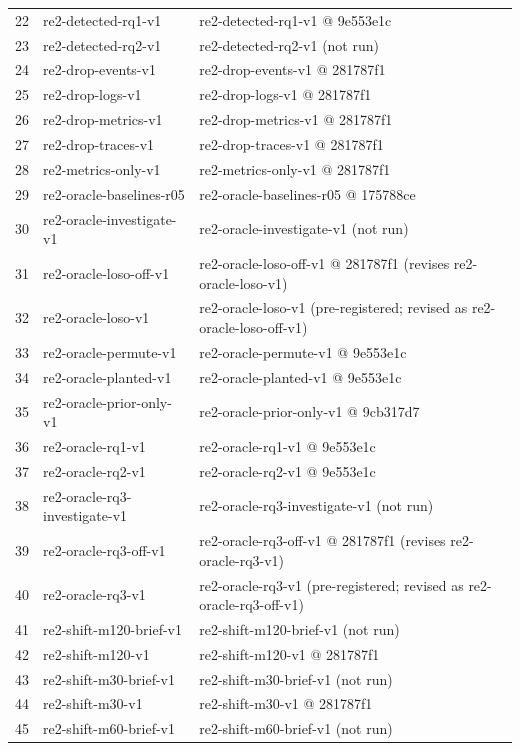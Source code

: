 \begin{longtable}{@{}r>{\raggedright\arraybackslash}p{108.0pt}>{\raggedright\arraybackslash}p{108.0pt}@{}}
22 & re2-detected-rq1-v1 & re2-detected-rq1-v1 @ 9e553e1c \\
23 & re2-detected-rq2-v1 & re2-detected-rq2-v1 (not run) \\
24 & re2-drop-events-v1 & re2-drop-events-v1 @ 281787f1 \\
25 & re2-drop-logs-v1 & re2-drop-logs-v1 @ 281787f1 \\
26 & re2-drop-metrics-v1 & re2-drop-metrics-v1 @ 281787f1 \\
27 & re2-drop-traces-v1 & re2-drop-traces-v1 @ 281787f1 \\
28 & re2-metrics-only-v1 & re2-metrics-only-v1 @ 281787f1 \\
29 & re2-oracle-baselines-r05 & re2-oracle-baselines-r05 @ 175788ce \\
30 & re2-oracle-investigate-v1 & re2-oracle-investigate-v1 (not run) \\
31 & re2-oracle-loso-off-v1 & re2-oracle-loso-off-v1 @ 281787f1 (revises re2-oracle-loso-v1) \\
32 & re2-oracle-loso-v1 & re2-oracle-loso-v1 (pre-registered; revised as re2-oracle-loso-off-v1) \\
33 & re2-oracle-permute-v1 & re2-oracle-permute-v1 @ 9e553e1c \\
34 & re2-oracle-planted-v1 & re2-oracle-planted-v1 @ 9e553e1c \\
35 & re2-oracle-prior-only-v1 & re2-oracle-prior-only-v1 @ 9cb317d7 \\
36 & re2-oracle-rq1-v1 & re2-oracle-rq1-v1 @ 9e553e1c \\
37 & re2-oracle-rq2-v1 & re2-oracle-rq2-v1 @ 9e553e1c \\
38 & re2-oracle-rq3-investigate-v1 & re2-oracle-rq3-investigate-v1 (not run) \\
39 & re2-oracle-rq3-off-v1 & re2-oracle-rq3-off-v1 @ 281787f1 (revises re2-oracle-rq3-v1) \\
40 & re2-oracle-rq3-v1 & re2-oracle-rq3-v1 (pre-registered; revised as re2-oracle-rq3-off-v1) \\
41 & re2-shift-m120-brief-v1 & re2-shift-m120-brief-v1 (not run) \\
42 & re2-shift-m120-v1 & re2-shift-m120-v1 @ 281787f1 \\
43 & re2-shift-m30-brief-v1 & re2-shift-m30-brief-v1 (not run) \\
44 & re2-shift-m30-v1 & re2-shift-m30-v1 @ 281787f1 \\
45 & re2-shift-m60-brief-v1 & re2-shift-m60-brief-v1 (not run) \\

\end{longtable}
